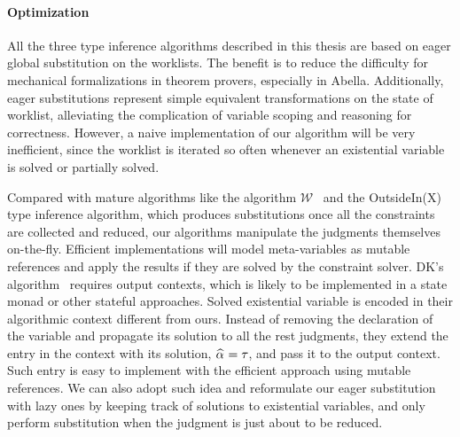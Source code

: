 
\paragraph{Optimization}

All the three type inference algorithms described
in this thesis are based on eager global substitution on the worklists.
The benefit is to reduce the difficulty for mechanical formalizations
in theorem provers, especially in Abella.
Additionally, eager substitutions represent simple equivalent transformations
on the state of worklist,
alleviating the complication of variable scoping and reasoning for correctness.
However, a naive implementation of our algorithm will be very inefficient,
since the worklist is iterated so often
whenever an existential variable is solved or partially solved.

Compared with mature algorithms like the algorithm $\mathcal{W}$~\citep{milner1978theory}
and the OutsideIn(X)~\citep{outsidein} type inference algorithm,
which produces substitutions once all the constraints are collected and reduced,
our algorithms manipulate the judgments themselves on-the-fly.
Efficient implementations will model meta-variables as mutable references
and apply the results if they are solved by the constraint solver.
DK's algorithm~\citep{dunfield2013complete} requires output contexts,
which is likely to be implemented in a state monad or other stateful approaches.
Solved existential variable is encoded in their algorithmic context different from ours.
Instead of removing the declaration of the variable and propagate its solution to
all the rest judgments, they extend the entry in the context with its solution,
$\al = \tau$, and pass it to the output context.
Such entry is easy to implement with the efficient approach using mutable references.
We can also adopt such idea and reformulate our eager substitution with
lazy ones by keeping track of solutions to existential variables,
and only perform substitution when the judgment is just about to be reduced.

